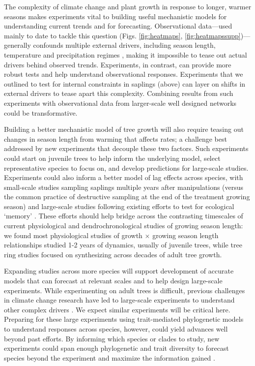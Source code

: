 \documentclass[11pt]{article}
\newcommand{\R}[1]{\label{#1}\linelabel{#1}}
\begin{document}
The complexity of climate change and plant growth in response to longer, warmer seasons makes experiments vital to building useful mechanistic models for understanding current trends and for forecasting. Observational data---used mainly to date to tackle this question (Figs. \ref{fig:heatmaps}, \ref{fig:heatmapssupp})---generally confounds multiple external drivers, including season length, temperature and precipitation regimes \citep{ren2019,ipcc2021,camarero2022decoupled}, making it impossible to tease out actual drivers behind observed trends. Experiments, in contrast, can provide more robust tests and help understand observational responses. Experiments that we outlined to test for internal constraints in saplings (above) can layer on shifts in external drivers to tease apart this complexity. Combining results from such experiments with observational data from larger-scale well designed networks \citep[see][]{schuldt2020first} could be transformative.\R{bigKextreme2} %

Building a better mechanistic model of tree growth will also require teasing out changes in season length from warming that affects rates; a challenge best addressed by new experiments that decouple these two factors. Such experiments could start on juvenile trees to help inform the underlying model, select representative species to focus on, and  develop predictions for large-scale studies. Experiments could also inform a better model of lag effects across species, with small-scale studies sampling saplings multiple years after manipulations (versus the common practice of destructive sampling at the end of the treatment growing season) and large-scale studies following existing efforts to test for ecological `memory'  \citep[e.g. ][]{flinker2021promise,schweiger2022transgenerational,chinmemory}. These efforts should help bridge across the contrasting timescales of current physiological and dendrochronological studies of growing season length: we found most physiological studies of growth $\times$ growing season length relationships studied 1-2 years of dynamics, usually of juvenile trees, while tree ring studies focused on synthesizing across decades of adult tree growth.

Expanding studies across more species will support development of accurate models that can forecast at relevant scales and to help design large-scale experiments. While experimenting on adult trees is difficult, previous challenges in climate change research have led to large-scale experiments to understand other complex drivers \citep[e.g. SPRUCE, DroughtNet, Pfynwald,][]{norby2011ecological,hanson2017attaining,smith2016drought}. We expect similar experiments will be critical here. Preparing for these large experiments using trait-mediated phylogenetic models to understand responses across species, however, could yield advances well beyond past efforts. By informing which species or clades to study, new experiments could span enough phylogenetic and trait diversity to forecast species beyond the experiment and maximize the information gained \citep{cadotte2017phylogenies}. 
\end{document}
